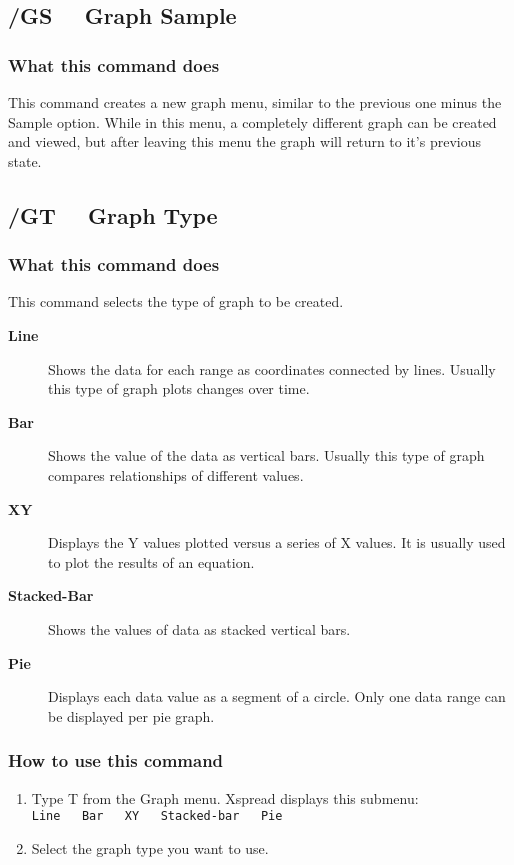 \subsection*{/GS \ \	 Graph Sample}

\subsubsection*{What this command does}
This command creates a new graph menu, similar to the previous one minus
the Sample option.  While in this menu, a completely different graph can be
created and viewed, but after leaving this menu the graph will return
to it's previous state.
 
\subsection*{/GT \ \     Graph Type}

\subsubsection*{What this command does}
This command selects the type of graph to be created.
\begin{description}
\item[{\bf Line}]{Shows the data for each range as coordinates connected
        by lines.  Usually this type of graph plots changes over
        time.}
\item[{\bf Bar}]{Shows the value of the data as vertical bars.
        Usually this type of graph compares relationships of different values.}
\item[{\bf XY  }]{Displays the Y values plotted versus a series of X
        values. It is usually used to plot the results of an equation.}
\item[{\bf Stacked-Bar}]{ Shows the values of data as stacked vertical bars.}
\item[{\bf Pie}]{Displays each data value as a segment of a circle. Only one
        data range can be displayed per pie graph.}
\end{description}
        
\subsubsection*{How to use this command}
\begin{enumerate}
\item{Type T from the Graph menu.  Xspread displays this submenu:\\
        {\tt Line \ \   Bar \ \    XY \ \     Stacked-bar \ \    Pie}}
\item{Select the graph type you want to use.}
\end{enumerate}
        
